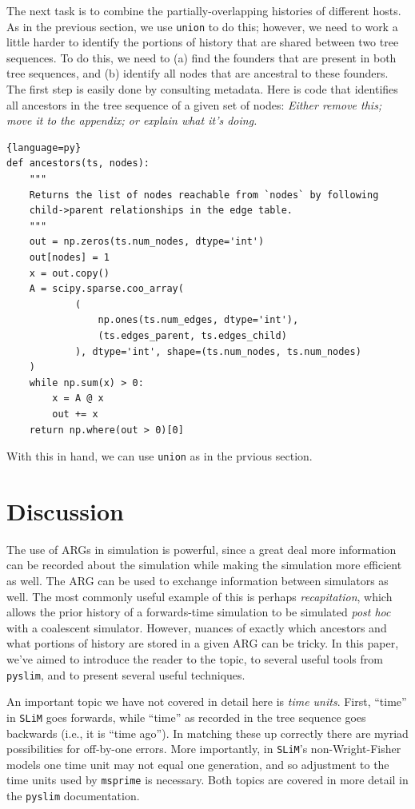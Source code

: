 \documentclass[12pt]{article}
\newcommand{\msprime}[0]{\texttt{msprime}\xspace}
\newcommand{\slim}[0]{\texttt{SLiM}\xspace}
\newcommand{\pyslim}[0]{\texttt{pyslim}\xspace}
\newcommand{\comment}[1]{\textit{\color{green} #1}}
\begin{document}
The next task is to combine the partially-overlapping histories of different hosts.
As in the previous section, we use \verb|union| to do this;
however, we need to work a little harder
to identify the portions of history that are shared between two tree sequences.
To do this, we need to
(a) find the founders that are present in both tree sequences,
and (b) identify all nodes that are ancestral to these founders.
The first step is easily done by consulting metadata.
Here is code that identifies all ancestors in the tree sequence
of a given set of nodes:
\comment{Either remove this; move it to the appendix; or explain what it's doing.}
\begin{lstlisting}{language=py}
def ancestors(ts, nodes):
    """
    Returns the list of nodes reachable from `nodes` by following
    child->parent relationships in the edge table.
    """
    out = np.zeros(ts.num_nodes, dtype='int')
    out[nodes] = 1
    x = out.copy()
    A = scipy.sparse.coo_array(
            (
                np.ones(ts.num_edges, dtype='int'),
                (ts.edges_parent, ts.edges_child)
            ), dtype='int', shape=(ts.num_nodes, ts.num_nodes)
    )
    while np.sum(x) > 0:
        x = A @ x
        out += x
    return np.where(out > 0)[0]
\end{lstlisting}
With this in hand, we can use \verb|union|
as in the prvious section.


\section*{Discussion}

The use of ARGs in simulation is powerful,
since a great deal more information can be recorded about the simulation
while making the simulation more efficient as well.
The ARG can be used to exchange information between simulators as well.
The most commonly useful example of this is perhaps \emph{recapitation},
which allows the prior history of a forwards-time simulation
to be simulated \emph{post hoc} with a coalescent simulator.
However, nuances of exactly which ancestors and what portions of history
are stored in a given ARG can be tricky.
In this paper, we've aimed to introduce the reader to the topic,
to several useful tools from \pyslim,
and to present several useful techniques.

An important topic we have not covered in detail here is \emph{time units}.
First, ``time'' in \slim goes forwards, while ``time'' as recorded in the tree sequence goes backwards (i.e., it is ``time ago'').
In matching these up correctly there are myriad possibilities for off-by-one errors.
More importantly, in \slim's non-Wright-Fisher models one time unit may not equal one generation,
and so adjustment to the time units used by \msprime is necessary.
Both topics are covered in more detail in the \pyslim documentation.
\end{document}
